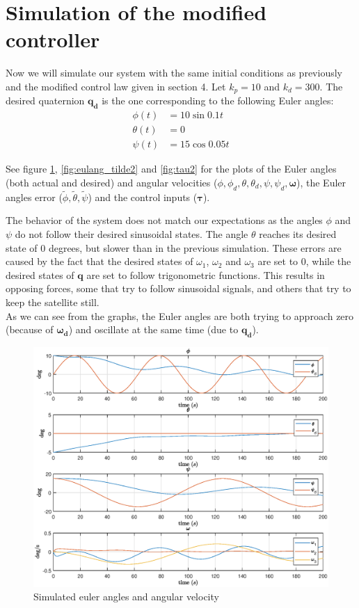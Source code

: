 \section{Simulation of the modified controller}
Now we will simulate our system with the same initial conditions as previously and the modified control law given in section 4. Let $k_p = 10$ and $k_d = 300.$
The desired quaternion $\mathbf{q_d}$  is the one corresponding to the following Euler angles: 
\begin{align*}
    \phi(t) &= 10 \sin{0.1t} \\
    \theta(t) &= 0 \\
    \psi(t) &= 15 \cos{0.05t}
\end{align*}

See figure \ref{fig:eulang2}, \ref{fig:eulang_tilde2} and \ref{fig:tau2}  for the plots of the Euler angles (both actual and desired) and angular velocities ($\phi, \phi_d, \theta, \theta_d, \psi, \psi_d, \boldsymbol{\omega}$), the Euler angles error ($\tilde \phi, \tilde \theta, \tilde \psi$) and the control inputs ($\boldsymbol{\tau}$).

The behavior of the system does not match our expectations as the angles $\phi$ and $\psi$ do not follow their desired sinusoidal states. The angle $\theta$ reaches its desired state of 0 degrees, but slower than in the previous simulation. These errors are caused by the fact that the desired states of $\omega_1$, $\omega_2$ and $\omega_3$ are set to 0, while the desired states of $\mathbf{q}$ are set to follow trigonometric functions. This results in opposing forces, some that try to follow sinusoidal signals, and others that try to keep the satellite still.\\
As we can see from the graphs, the Euler angles are both trying to approach zero (because of $\mathbf{\omega_d}$) and oscillate at the same time (due to $\mathbf{q_d}$).


\begin{figure}[h!]
    \centering
    \includegraphics[scale=0.65]{eulang2.eps}
    \caption{Simulated euler angles and angular velocity}
    \label{fig:eulang2}
\end{figure}

